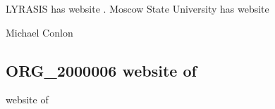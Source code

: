 \documentclass[letterpaper,10pt,english]{sphinxmanual}
\begin{document}
\begin{sphinxShadowBox}

\sphinxAtStartPar
{\hyperref[\detokenize{doc-ORG_0000001::doc}]{}}
\end{sphinxShadowBox}

\begin{sphinxShadowBox}

\sphinxAtStartPar
{\hyperref[\detokenize{doc-ORG_0000050::doc}]{}}
\end{sphinxShadowBox}

\begin{sphinxShadowBox}

\sphinxAtStartPar
{\hyperref[\detokenize{doc-ORG_2000006::doc}]{}}
\end{sphinxShadowBox}

\begin{sphinxShadowBox}

\sphinxAtStartPar
LYRASIS has website .  Moscow State University has website 
\end{sphinxShadowBox}

\begin{sphinxShadowBox}

\sphinxAtStartPar
Michael Conlon 
\end{sphinxShadowBox}
\begin{quote}

\ignorespaces \end{quote}


\subsection{ORG\_2000006 \sphinxhyphen{} website of}
\label{\detokenize{doc-ORG_2000006:org-2000006-website-of}}\label{\detokenize{doc-ORG_2000006:index-0}}\label{\detokenize{doc-ORG_2000006::doc}}
\begin{sphinxShadowBox}

\sphinxAtStartPar
website of
\end{sphinxShadowBox}
\end{document}
